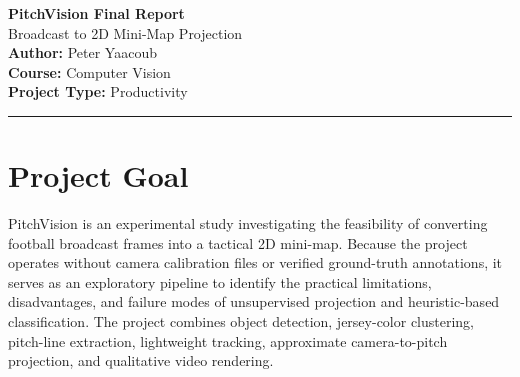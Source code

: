 \documentclass[11pt]{article}
\begin{document}
\begin{center}
    {\Large \textbf{PitchVision Final Report}} \\
    {\large Broadcast to 2D Mini-Map Projection} \\
    \vspace{0.15cm}
    \textbf{Author:} Peter Yaacoub \\
    \textbf{Course:} Computer Vision \\
    \textbf{Project Type:} Productivity
\end{center}

\vspace{0.2cm}
\hrule

\section{Project Goal}
PitchVision is an experimental study investigating the feasibility of converting football broadcast frames into a tactical 2D mini-map. Because the project operates without camera calibration files or verified ground-truth annotations, it serves as an exploratory pipeline to identify the practical limitations, disadvantages, and failure modes of unsupervised projection and heuristic-based classification. The project combines object detection, jersey-color clustering, pitch-line extraction, lightweight tracking, approximate camera-to-pitch projection, and qualitative video rendering.
\end{document}
